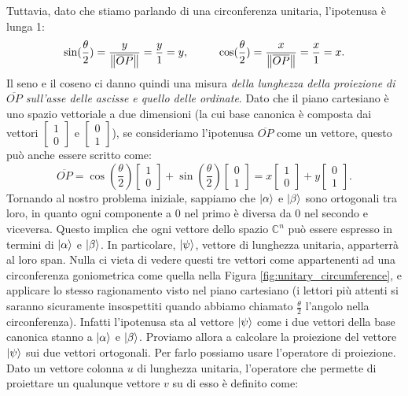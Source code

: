 \documentclass{book}
\theoremstyle{definition}
\theoremstyle{definition}
\theoremstyle{definition}
\theoremstyle{plain}
\theoremstyle{plain}
\theoremstyle{plain}
\theoremstyle{plain}
\begin{document}
Tuttavia, dato che stiamo parlando di una circonferenza unitaria, l'ipotenusa è lunga 1:
\begin{displaymath}
\sin(\frac{\theta}{2}) = \frac{y}{\left\lVert \overline{OP} \right\rVert} = \frac{y}{1} = y, \mkern50mu \cos(\frac{\theta}{2}) = \frac{x}{\left\lVert \overline{OP} \right\rVert} = \frac{x}{1} = x.
\end{displaymath}
Il seno e il coseno ci danno quindi una misura \emph{della lunghezza della proiezione di $\overline{OP}$ sull'asse delle ascisse e quello delle ordinate}. Dato che il piano cartesiano è uno spazio vettoriale a due dimensioni (la cui base canonica è composta dai vettori $\begin{bmatrix}
1 \\
0
\end{bmatrix}$ e $\begin{bmatrix}
0 \\
1
\end{bmatrix}$), se consideriamo l'ipotenusa $\overline{OP}$ come un vettore, questo può anche essere scritto come:
\begin{displaymath}
\overline{OP} = \cos(\frac{\theta}{2}) \begin{bmatrix}
1 \\
0
\end{bmatrix} + \sin(\frac{\theta}{2}) \begin{bmatrix}
0 \\
1
\end{bmatrix} = x \begin{bmatrix}
1 \\
0
\end{bmatrix} + y \begin{bmatrix}
0 \\
1
\end{bmatrix}.
\end{displaymath}
Tornando al nostro problema iniziale, sappiamo che $\ket{\alpha}$ e $\ket{\beta}$ sono ortogonali tra loro, in quanto ogni componente a 0 nel primo è diversa da 0 nel secondo e viceversa. Questo implica che ogni vettore dello spazio $\mathbb{C} ^{n}$ può essere espresso in termini di $\ket{\alpha}$ e $\ket{\beta}$. In particolare, $\ket{\psi}$, vettore di lunghezza unitaria, apparterrà al loro span. Nulla ci vieta di vedere questi tre vettori come appartenenti ad una circonferenza goniometrica come quella nella Figura \ref{fig:unitary_circumference}, e applicare lo stesso ragionamento visto nel piano cartesiano (i lettori più attenti si saranno sicuramente insospettiti quando abbiamo chiamato $\frac{\theta}{2}$ l'angolo nella circonferenza). Infatti l'ipotenusa sta al vettore $\ket{\psi}$ come i due vettori della base canonica stanno a $\ket{\alpha}$ e $\ket{\beta}$. Proviamo allora a calcolare la proiezione del vettore $\ket{\psi}$ sui due vettori ortogonali. Per farlo possiamo usare l'operatore di proiezione. Dato un vettore colonna $u$ di lunghezza unitaria, l'operatore che permette di proiettare un qualunque vettore $v$ su di esso è definito come:
\end{document}
